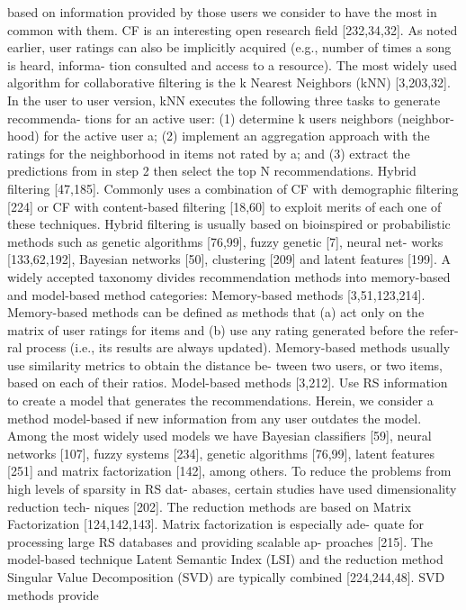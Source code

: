 \documentclass[11pt]{article}
\begin{document}
based on information provided by those users we consider to have
the most in common with them. CF is an interesting open research
field [232,34,32]. As noted earlier, user ratings can also be implicitly acquired (e.g., number of times a song is heard, informa-
tion consulted and access to a resource).
The most widely used algorithm for collaborative filtering is the
k Nearest Neighbors (kNN) [3,203,32]. In the user to user version,
kNN executes the following three tasks to generate recommenda-
tions for an active user: (1) determine k users neighbors (neighbor-
hood) for the active user a; (2) implement an aggregation approach
with the ratings for the neighborhood in items not rated by a; and
(3) extract the predictions from in step 2 then select the top N
recommendations.
Hybrid filtering [47,185]. Commonly uses a combination of CF
with demographic filtering [224] or CF with content-based filtering
[18,60] to exploit merits of each one of these techniques. Hybrid
filtering is usually based on bioinspired or probabilistic methods
such as genetic algorithms [76,99], fuzzy genetic [7], neural net-
works [133,62,192], Bayesian networks [50], clustering [209] and
latent features [199].
A widely accepted taxonomy divides recommendation methods
into memory-based and model-based method categories:
Memory-based methods [3,51,123,214]. Memory-based methods
can be defined as methods that (a) act only on the matrix of user
ratings for items and (b) use any rating generated before the refer-
ral process (i.e., its results are always updated). Memory-based
methods usually use similarity metrics to obtain the distance be-
tween two users, or two items, based on each of their ratios.
Model-based methods [3,212]. Use RS information to create a
model that generates the recommendations. Herein, we consider
a method model-based if new information from any user outdates
the model. Among the most widely used models we have Bayesian
classifiers [59], neural networks [107], fuzzy systems [234], genetic
algorithms [76,99], latent features [251] and matrix factorization
[142], among others.
To reduce the problems from high levels of sparsity in RS dat-
abases, certain studies have used dimensionality reduction tech-
niques [202]. The reduction methods are based on Matrix
Factorization [124,142,143]. Matrix factorization is especially ade-
quate for processing large RS databases and providing scalable ap-
proaches [215]. The model-based technique Latent Semantic Index
(LSI) and the reduction method Singular Value Decomposition
(SVD) are typically combined [224,244,48]. SVD methods provide
\end{document}
